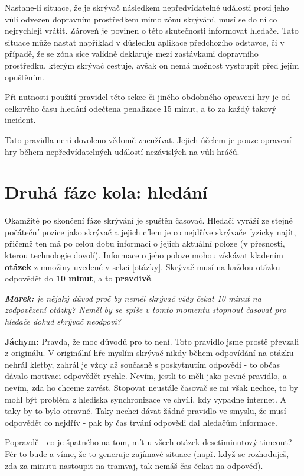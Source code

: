 \documentclass{book}
\newenvironment{reasoning}{\begin{small}\itshape}{\end{small}}
\def\timepenalty/{15 minut}
\def\timeanswerquestion/{10 minut}  %
\begin{document}
Nastane-li situace, že je skrývač následkem nepředvídatelné události proti jeho vůli odvezen dopravním prostředkem mimo zónu skrývání, musí se do ní co nejrychleji vrátit. Zároveň je povinen o této skutečnosti informovat hledače. Tato situace může nastat například v důsledku aplikace předchozího odstavce, či v případě, že se zóna sice validně deklaruje mezi zastávkami dopravního prostředku, kterým skrývač cestuje, avšak on nemá možnost vystoupit před jejím opuštěním.

Při nutnosti použití pravidel této sekce či jiného obdobného opravení hry je od celkového času hledání odečtena penalizace \timepenalty/, a to za každý takový incident.

Tato pravidla není dovoleno vědomě zneužívat. Jejich účelem je pouze opravení hry během nepředvídatelných událostí nezávislých na vůli hráčů.

\section{Druhá fáze kola: hledání}

Okamžitě po skončení fáze skrývání je spuštěn časovač. Hledači vyráží ze stejné počáteční pozice jako skrývač a jejich cílem je co nejdříve skrývače fyzicky najít, přičemž ten má po celou dobu informaci o jejich aktuální poloze (v přesnosti, kterou technologie dovolí). Informace o jeho poloze mohou získávat kladením \textbf{otázek} z množiny uvedené v sekci \ref{otázky}. Skrývač musí na každou otázku odpovědět do \textbf{\timeanswerquestion/}, a to \textbf{pravdivě}.

\begin{reasoning}
	\textbf{Marek:} je nějaký důvod proč by neměl skrývač vždy čekat 10 minut na zodpovězení otázky? Neměl by se spíše v tomto momentu stopnout časovat pro hledače dokud skrývač neodpoví?

	\textbf{Jáchym:} Pravda, že moc důvodů pro to není. Toto pravidlo jsme prostě převzali z originálu. V originální hře myslím skrývač nikdy během odpovídání na otázku nehrál kletby, zahrál je vždy až současně s poskytnutím odpovědi - to občas dávalo motivaci odpovědět rychle. Nevím, jestli to měli jako pevné pravidlo, a nevím, zda ho chceme zavést. Stopovat neustále časovač se mi však nechce, to by mohl být problém z hlediska synchronizace ve chvíli, kdy vypadne internet. A taky by to bylo otravné. Taky nechci dávat žádné pravidlo ve smyslu, že musí odpovědět co nejdřív - pak by čas trvání odpovědi dal hledačům informace.

	Popravdě - co je špatného na tom, mít u všech otázek desetiminutový timeout? Fér to bude a víme, že to generuje zajímavé situace (např. když se rozhoduješ, zda za minutu nastoupit na tramvaj, tak nemáš čas čekat na odpověď).
\end{reasoning}
\end{document}
